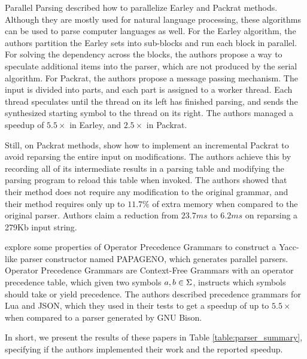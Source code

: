 \begin{section}{Parallel Parsing}
\cite{fowler2009parallel} described how to parallelize Earley
\citep{earley1970efficient} and Packrat \citep{ford2002packrat} methods.
Although they are mostly used for natural language processing, these algorithms
can be used to parse computer languages as well.  For the Earley algorithm, the
authors partition the Earley sets into sub-blocks and run each block in
parallel. For solving the dependency across the blocks, the authors propose a
way to speculate additional items into the parser, which are not produced by
the serial algorithm. For Packrat, the authors propose a message passing
mechanism.  The input is divided into parts, and each part is assigned to a
worker thread. Each thread speculates until the thread on its left has finished
parsing, and sends the synthesized starting symbol to the thread on its right.
The authors managed a speedup of $5.5\times$ in Earley, and $2.5\times$ in
Packrat.

Still, on Packrat methods, \cite{dubroy2017incremental} show how to implement
an incremental Packrat to avoid reparsing the entire input on modifications.
The authors achieve this by recording all of its intermediate results in a parsing
table and modifying the parsing program to reload this table when invoked. The
authors showed that their method does not require any modification to the
original grammar, and their method requires only up to $11.7\%$ of extra memory
when compared to the original parser. Authors claim a reduction from $23.7ms$
to $6.2ms$ on reparsing a 279Kb input string.

\cite{Barenghi:2015:PPM:2839536.2840146} explore some properties of Operator
Precedence Grammars to construct a Yacc-like parser constructor named PAPAGENO,
which generates parallel parsers. Operator Precedence Grammars are Context-Free
Grammars with an operator precedence table, which given two symbols $a, b \in
\Sigma$, instructs which symbols should take or yield precedence. The authors
described precedence grammars for Lua and JSON, which they used in their tests
to get a speedup of up to $5.5\times$ when compared to a parser generated by
GNU Bison.

In short, we present the results of these papers in Table
\ref{table:parser_summary}, specifying if the authors implemented their work
and the reported speedup.


\end{section}
